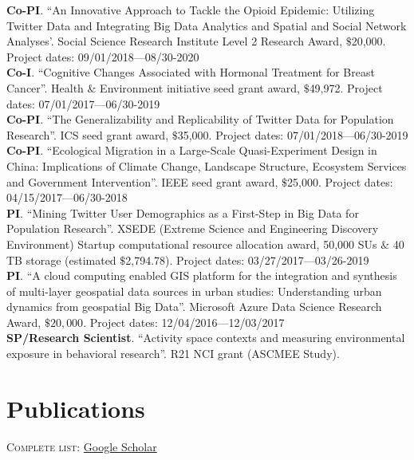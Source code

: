 \documentclass[11pt, a4paper]{article}
\begin{document}
\textbf{Co-PI}. ``An Innovative Approach to Tackle the Opioid Epidemic: Utilizing Twitter Data and Integrating Big Data Analytics and Spatial and Social Network Analyses'. Social Science Research Institute Level 2 Research Award, $\$$20,000. Project dates: 09/01/2018—08/30-2020\\
\textbf{Co-I}. ``Cognitive Changes Associated with Hormonal Treatment for Breast Cancer''. Health $\&$ Environment initiative seed grant award, $\$$49,972. Project dates: 07/01/2017—06/30-2019\\
\textbf{Co-PI}. ``The Generalizability and Replicability of Twitter Data for Population Research''. ICS seed grant award, $\$$35,000. Project dates: 07/01/2018—06/30-2019\\
\textbf{Co-PI}. ``Ecological Migration in a Large-Scale Quasi-Experiment Design in China: Implications of Climate Change, Landscape Structure, Ecosystem Services and Government Intervention''. IEEE seed grant award, $\$$25,000. Project dates: 04/15/2017—06/30-2018\\
\textbf{PI}. ``Mining Twitter User Demographics as a First-Step in Big Data for Population Research''. XSEDE (Extreme Science and Engineering Discovery Environment) Startup computational resource allocation award, 50,000 SUs $\&$ 40 TB storage (estimated $\$$2,794.78). Project dates: 03/27/2017—03/26-2019\\
\textbf{PI}. ``A cloud computing enabled GIS platform for the integration and synthesis of multi-layer geospatial data sources in urban studies: Understanding urban dynamics from geospatial Big Data''. Microsoft Azure Data Science Research Award, $\$20,000$. Project dates: 12/04/2016—12/03/2017\\
\textbf{SP/Research Scientist}. ``Activity space contexts and measuring environmental exposure in behavioral research''. R21 NCI grant (ASCMEE Study).

\section*{Publications}
\textsc{Complete list}: \href{https://scholar.google.com/citations?hl=en&user=LW01O2YAAAAJ&view_op=list_works&sortby=pubdate}{Google Scholar}
\end{document}
